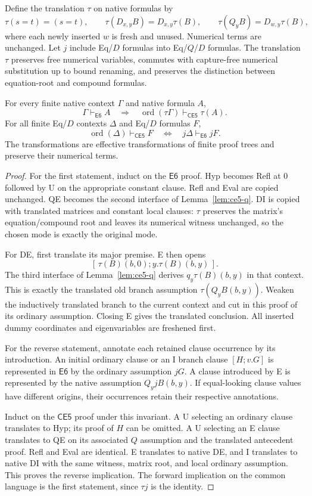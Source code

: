 Define the translation $\tau$ on native formulas by
\[
 \tau(s=t)=(s=t),\qquad
 \tau(D_{x,y}B)=D_{x,y}\tau(B),\qquad
 \tau(Q_yB)=D_{w,y}\tau(B),
\]
where each newly inserted $w$ is fresh and unused. Numerical terms are
unchanged. Let $j$ include Eq/$D$ formulas into Eq/$Q$/$D$ formulas.
The translation $\tau$ preserves free numerical variables, commutes
with capture-free numerical substitution up to bound renaming, and
preserves the distinction between equation-root and compound formulas.

\begin{theorem}
\label{thm:ce5-proof-equivalence}
For every finite native context $\Gamma$ and native formula $A$,
\[
 \Gamma\vdash_{\mathsf{E6}} A
 \quad\Longrightarrow\quad
 \operatorname{ord}(\tau\Gamma)\vdash_{\mathsf{CE5}}\tau(A).
\]
For all finite Eq/$D$ contexts $\Delta$ and Eq/$D$ formulas $F$,
\[
 \operatorname{ord}(\Delta)\vdash_{\mathsf{CE5}}F
 \quad\Longleftrightarrow\quad
 j\Delta\vdash_{\mathsf{E6}}jF.
\]
The transformations are effective transformations of finite proof trees
and preserve their numerical terms.
\end{theorem}
\begin{proof}
For the first statement, induct on the $\mathsf{E6}$ proof.
Hyp becomes Refl at $0$ followed by U on the appropriate constant
clause. Refl and Eval are copied unchanged. QE becomes the second
interface of Lemma~\ref{lem:ce5-q}. DI is copied with translated
matrices and constant local clauses: $\tau$ preserves the matrix's
equation/compound root and leaves its numerical witness unchanged,
so the chosen mode is exactly the original mode.

For DE, first translate its major premise. E then opens
\[
 [\,\tau(B)(b,0);y.\tau(B)(b,y)\,].
\]
The third interface of Lemma~\ref{lem:ce5-q} derives
$q_y\tau(B)(b,y)$ in that context. This is exactly the translated old
branch assumption $\tau(Q_yB(b,y))$. Weaken the inductively translated
branch to the current context and cut in this proof of its ordinary
assumption. Closing E gives the translated conclusion. All inserted
dummy coordinates and eigenvariables are freshened first.

For the reverse statement, annotate each retained clause occurrence
by its introduction. An initial ordinary clause or an I branch clause
$[H;v.G]$ is represented in $\mathsf{E6}$ by the ordinary assumption
$jG$. A clause introduced by E is represented by the native assumption
$Q_yjB(b,y)$. If equal-looking clause values have different origins,
their occurrences retain their respective annotations.

Induct on the $\mathsf{CE5}$ proof under this invariant. A U selecting
an ordinary clause translates to Hyp; its proof of $H$ can be omitted.
A U selecting an E clause translates to QE on its associated $Q$
assumption and the translated antecedent proof. Refl and Eval are
identical. E translates to native DE, and I translates to native DI
with the same witness, matrix root, and local ordinary assumption.
This proves the reverse implication. The forward implication on the
common language is the first statement, since $\tau j$ is the identity.
\end{proof}

